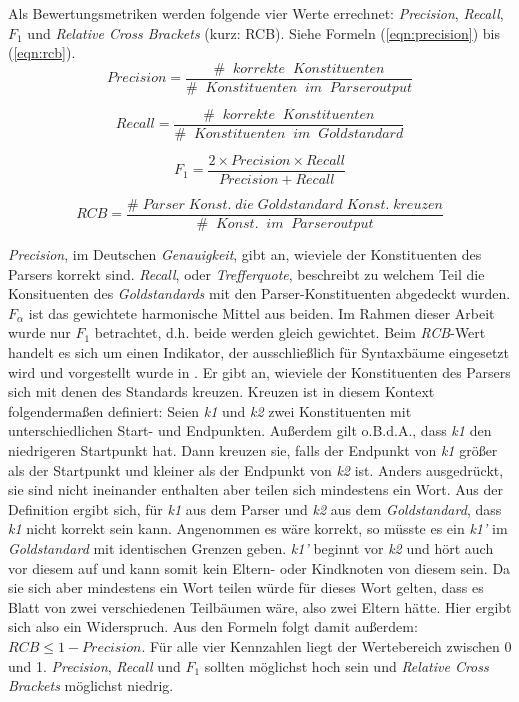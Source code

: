 Als Bewertungsmetriken werden folgende vier Werte errechnet: \textit{Precision}, \textit{Recall}, \(F_1\) und \textit{Relative Cross Brackets} (kurz: RCB). Siehe Formeln (\ref{eqn:precision}) bis (\ref{eqn:rcb}). \\ 
\begin{equation}
Precision = \frac{\# \;\; korrekte \;\; Konstituenten}{ \# \;\; Konstituenten \;\; im \;\; Parseroutput}
\label{eqn:precision}
\end{equation}

\begin{equation}
Recall = \frac{\# \;\; korrekte \;\; Konstituenten}{ \# \;\; Konstituenten \;\; im \;\; Goldstandard}
\end{equation}

\begin{equation}
F_1 = \frac{2 \times Precision \times Recall}{ Precision + Recall}
\end{equation}

\begin{equation}
RCB = \frac{\# \; Parser \; Konst. \; die \; Goldstandard \; Konst. \; kreuzen}{ \# \;\; Konst. \;\; im \;\; Parseroutput}
\label{eqn:rcb}
\end{equation}

\textit{Precision}, im Deutschen \textit{Genauigkeit}, gibt an, wieviele der Konstituenten des Parsers korrekt sind. \textit{Recall}, oder \textit{Trefferquote}, beschreibt zu welchem Teil die Konsituenten des \textit{Goldstandards} mit den Parser-Konstituenten abgedeckt wurden. \(F_\alpha\) ist das gewichtete harmonische Mittel aus beiden. Im Rahmen dieser Arbeit wurde nur \(F_1\) betrachtet, d.h. beide werden gleich gewichtet. Beim \textit{RCB}-Wert handelt es sich um einen Indikator, der ausschließlich für Syntaxbäume eingesetzt wird und vorgestellt wurde in \cite{crossbrackets}. Er gibt an, wieviele der Konstituenten des Parsers sich mit denen des Standards kreuzen. Kreuzen ist in diesem Kontext folgendermaßen definiert: Seien \textit{k1} und \textit{k2} zwei Konstituenten mit unterschiedlichen Start- und Endpunkten. Außerdem gilt o.B.d.A., dass \textit{k1} den niedrigeren Startpunkt hat. Dann kreuzen sie, falls der Endpunkt von \textit{k1} größer als der Startpunkt und kleiner als der Endpunkt von \textit{k2} ist. Anders ausgedrückt, sie sind nicht ineinander enthalten aber teilen sich mindestens ein Wort. %
Aus der Definition ergibt sich, für \textit{k1} aus dem Parser und \textit{k2} aus dem \textit{Goldstandard}, dass \textit{k1} nicht korrekt sein kann. Angenommen es wäre korrekt, so müsste es ein \textit{k1'} im \textit{Goldstandard} mit identischen Grenzen geben. \textit{k1'} beginnt vor \textit{k2} und hört auch vor diesem auf und kann somit kein Eltern- oder Kindknoten von diesem sein. Da sie sich aber mindestens ein Wort teilen würde für dieses Wort gelten, dass es Blatt von zwei verschiedenen Teilbäumen wäre, also zwei Eltern hätte. Hier ergibt sich also ein Widerspruch. Aus den Formeln folgt damit außerdem: \( RCB \leq 1 - Precision \). Für alle vier Kennzahlen liegt der Wertebereich zwischen 0 und 1. \textit{Precision}, \textit{Recall} und \(F_1\) sollten möglichst hoch sein und \textit{Relative Cross Brackets} möglichst niedrig.